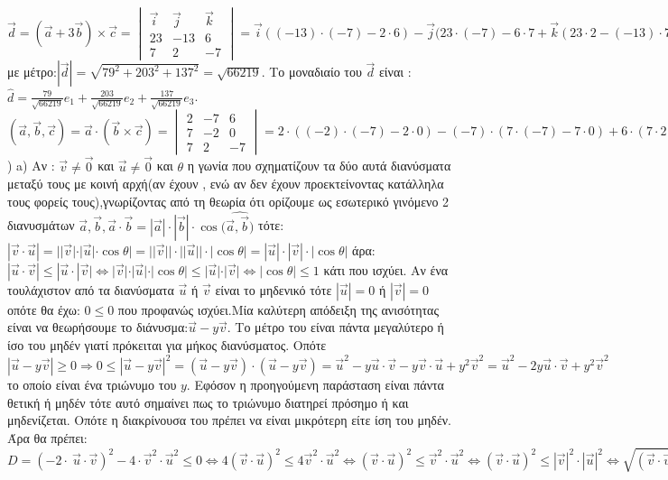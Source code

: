 \documentclass{article}
\begin{document}
$\vec{d}=(\vec{a} + 3\vec{b})\times\vec{c}=\begin{vmatrix} \vec{i} & \vec{j} & \vec{k} \\ 23 & -13 & 6 \\ 7 & 2 & -7 \end{vmatrix}=\vec{i}((-13)\cdot(-7) -2\cdot6) - \vec{j}(23\cdot(-7) -6\cdot7 + \vec{k}(23\cdot2-(-13)\cdot7)=79\vec{i} + 203\vec{j} + 137\vec{k}=(79,203,137).$ με μέτρο:$|\vec{d}|=\sqrt{79^2+203^2+137^2}=\sqrt{66219}$. Το μοναδιαίο του $\vec{d}$ είναι : \newline
$\hat{d}=\frac{79}{\sqrt{66219}}e_1 + \frac{203}{\sqrt{66219}}e_2 + \frac{137}{\sqrt{66219}}e_3$.
\newline
$(\vec{a},\vec{b},\vec{c})=\vec{a}\cdot(\vec{b}\times\vec{c})=\begin{vmatrix} 2 & -7 & 6 \\ 7 & -2 & 0 \\ 7 & 2 & -7 \end{vmatrix}=2\cdot((-2)\cdot(-7) -2\cdot0) -(-7)\cdot(7\cdot(-7) -7\cdot0) + 6\cdot(7\cdot2 -(-2)\cdot7)=7\cdot28 - 7\cdot49=7\cdot(-21)=-147.$ ) \newline
a) Αν : $\vec{v}\neq\vec{0}$ και $\vec{u}\neq\vec{0}$ και $\theta$ η γωνία που σχηματίζουν τα δύο αυτά διανύσματα μεταξύ τους με κοινή αρχή(αν έχουν , ενώ αν δεν έχουν προεκτείνοντας κατάλληλα τους φορείς τους),γνωρίζοντας από τη θεωρία ότι ορίζουμε ως εσωτερικό γινόμενο 2 διανυσμάτων $\vec{a},\vec{b} ,\vec{a}\cdot\vec{b}=|\vec{a}|\cdot|\vec{b}|\cdot\cos{(\widehat{\vec{a},\vec{b})}} $  τότε: $|\vec{v}\cdot\vec{u}|=||\vec{v}|\cdot|\vec{u}|\cdot\cos{\theta}|=||\vec{v}||\cdot||\vec{u}||\cdot|\cos{\theta}|=|\vec{u}|\cdot|\vec{v}|\cdot|\cos{\theta}|$ άρα: \newline
$|\vec{u}\cdot\vec{v}|\leq|\vec{u}\cdot|\vec{v}|\iff |\vec{v}|\cdot|\vec{u}|\cdot|\cos{\theta}|\leq|\vec{u}|\cdot|\vec{v}|\iff |\cos{\theta}|\leq1$ κάτι που ισχύει.\newline
Αν ένα τουλάχιστον από τα διανύσματα $\vec{u}$ ή $\vec{v}$ είναι το μηδενικό τότε $|\vec{u}|=0$ ή $|\vec{v}|=0$ οπότε θα έχω: $0\leq0$ που προφανώς ισχύει.\newline Μία καλύτερη απόδειξη της ανισότητας είναι να θεωρήσουμε το διάνυσμα:$\vec{u}-y\vec{v}$. Το μέτρο του είναι πάντα μεγαλύτερο ή ίσο του μηδέν γιατί πρόκειται για μήκος διανύσματος. Οπότε $|\vec{u}-y\vec{v}|\geq0 \Rightarrow 0\leq|\vec{u}-y\vec{v}|^2=(\vec{u}-y\vec{v})\cdot(\vec{u}-y\vec{v})=\vec{u}^2 -y\vec{u}\cdot\vec{v}-y\vec{v}\cdot\vec{u}+y^2\vec{v}^2=\vec{u}^2 -2y\vec{u}\cdot\vec{v}+y^2\vec{v}^2$ το οποίο είναι ένα τριώνυμο του $y$. Εφόσον η προηγούμενη παράσταση είναι πάντα θετική ή μηδέν τότε αυτό σημαίνει πως το τριώνυμο διατηρεί πρόσημο ή και μηδενίζεται. Οπότε η διακρίνουσα του πρέπει να είναι μικρότερη είτε ίση του μηδέν. Άρα θα πρέπει: $D=(-2\cdot\ \vec{u}\cdot \vec{v})^2 -4\cdot \vec{v}^2\cdot \vec{u}^2\leq0 \iff 4(\vec{v}\cdot\vec{u})^2\leq4\vec{v}^2\cdot \vec{u}^2 \iff (\vec{v}\cdot\vec{u})^2\leq\vec{v}^2\cdot \vec{u}^2 \iff (\vec{v}\cdot\vec{u})^2\leq|\vec{v}|^2\cdot |\vec{u}|^2 \iff \sqrt{(\vec{v}\cdot\vec{u})^2}\leq\sqrt{|\vec{v}|^2\cdot |\vec{u}|^2} \iff \sqrt{(\vec{v}\cdot\vec{u})^2}\leq\sqrt{|\vec{v}|^2}\cdot\sqrt{|\vec{u}|^2} \iff |\vec{v}\cdot\vec{u}|\leq|\vec{v}|\cdot|\vec{u}|$
\end{document}
